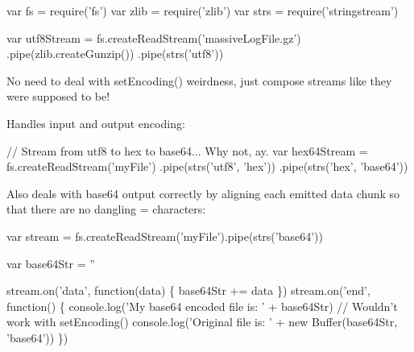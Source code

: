 
\begin{DoxyCode}
var fs   = require('fs')
var zlib = require('zlib')
var strs = require('stringstream')

var utf8Stream = fs.createReadStream('massiveLogFile.gz')
  .pipe(zlib.createGunzip())
  .pipe(strs('utf8'))
\end{DoxyCode}


No need to deal with {\ttfamily set\+Encoding()} weirdness, just compose streams like they were supposed to be!

Handles input and output encoding\+:


\begin{DoxyCode}
// Stream from utf8 to hex to base64... Why not, ay.
var hex64Stream = fs.createReadStream('myFile')
  .pipe(strs('utf8', 'hex'))
  .pipe(strs('hex', 'base64'))
\end{DoxyCode}


Also deals with {\ttfamily base64} output correctly by aligning each emitted data chunk so that there are no dangling {\ttfamily =} characters\+:


\begin{DoxyCode}
var stream = fs.createReadStream('myFile').pipe(strs('base64'))

var base64Str = ''

stream.on('data', function(data) \{ base64Str += data \})
stream.on('end', function() \{
  console.log('My base64 encoded file is: ' + base64Str) // Wouldn't work with setEncoding()
  console.log('Original file is: ' + new Buffer(base64Str, 'base64'))
\})
\end{DoxyCode}
 